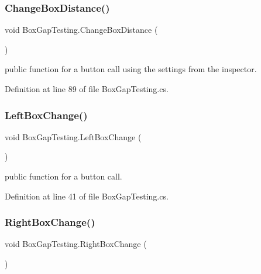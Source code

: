 \subsubsection{\texorpdfstring{Change\+Box\+Distance()}{ChangeBoxDistance()}}
{\footnotesize\ttfamily void Box\+Gap\+Testing.\+Change\+Box\+Distance (\begin{DoxyParamCaption}{ }\end{DoxyParamCaption})}



public function for a button call using the settings from the inspector. 



Definition at line 89 of file Box\+Gap\+Testing.\+cs.

\mbox{\label{class_box_gap_testing_a03667bc0c91f50945b1c4e35c5a54011}} 
\subsubsection{\texorpdfstring{Left\+Box\+Change()}{LeftBoxChange()}}
{\footnotesize\ttfamily void Box\+Gap\+Testing.\+Left\+Box\+Change (\begin{DoxyParamCaption}{ }\end{DoxyParamCaption})}



public function for a button call. 



Definition at line 41 of file Box\+Gap\+Testing.\+cs.

\mbox{\label{class_box_gap_testing_adeb99d0b392bf06123f31aeded6ee4a8}} 
\subsubsection{\texorpdfstring{Right\+Box\+Change()}{RightBoxChange()}}
{\footnotesize\ttfamily void Box\+Gap\+Testing.\+Right\+Box\+Change (\begin{DoxyParamCaption}{ }\end{DoxyParamCaption})}



